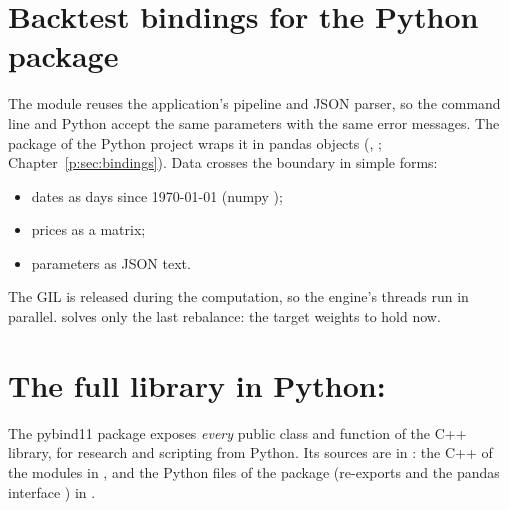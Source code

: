 \chapter{Backtest bindings for the Python package}\label{c:sec:rbbindings}
The module  reuses the application's pipeline and
JSON parser, so the command line and Python accept the same parameters with the same error
messages. The  package of the Python project wraps it in pandas objects
(, ; Chapter~\ref{p:sec:bindings}).
Data crosses the boundary in simple forms:
\begin{itemize}
  \item dates as  days since 1970-01-01 (numpy );
  \item prices as a  matrix;
  \item parameters as JSON text.
\end{itemize}
The GIL is released during the computation, so the engine's threads run in parallel.
 solves only the last rebalance: the target weights to hold now.
\begin{codepointers}
\end{codepointers}

\chapter{The full library in Python: \texorpdfstring{}{nabia\_python\_bridge}}\label{c:sec:bridge}

The pybind11 package  exposes \emph{every} public class and
function of the C++ library, for research and scripting from Python. Its sources are in
: the C++ of the modules in , and the Python files of the package
(re-exports and the pandas interface ) in .

